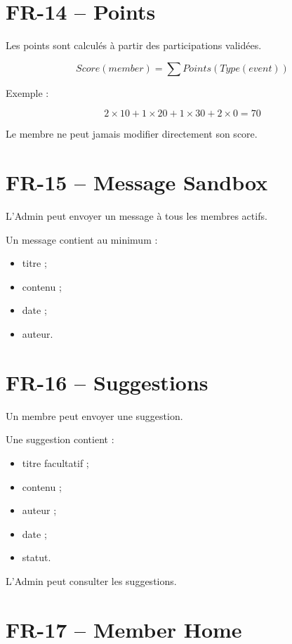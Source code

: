 \documentclass[11pt,a4paper]{report}
\begin{document}
\section{FR-14 -- Points}

Les points sont calculés à partir des participations validées.

\[
Score(member) = \sum Points(Type(event))
\]

Exemple :

\[
2\times10 + 1\times20 + 1\times30 + 2\times0 = 70
\]

Le membre ne peut jamais modifier directement son score.

\section{FR-15 -- Message Sandbox}

L'Admin peut envoyer un message à tous les membres actifs.

Un message contient au minimum :

\begin{itemize}
    \item titre ;
    \item contenu ;
    \item date ;
    \item auteur.
\end{itemize}

\section{FR-16 -- Suggestions}

Un membre peut envoyer une suggestion.

Une suggestion contient :

\begin{itemize}
    \item titre facultatif ;
    \item contenu ;
    \item auteur ;
    \item date ;
    \item statut.
\end{itemize}

L'Admin peut consulter les suggestions.

\section{FR-17 -- Member Home}
\end{document}
